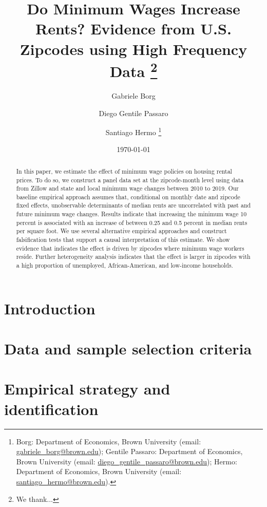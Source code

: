 \documentclass{article}
\title{Do Minimum Wages Increase Rents? 
	   Evidence from U.S. Zipcodes using High Frequency Data 
	   \thanks{We thank...}} %
\author{Gabriele Borg \and Diego Gentile Passaro \and Santiago Hermo
		\footnote{Borg: Department of Economics, Brown University (email: 
		\url{gabriele_borg@brown.edu}); 
		Gentile Passaro: Department of Economics, Brown University (email: 
		\url{diego_gentile_passaro@brown.edu}); 
		Hermo: Department of Economics, Brown University (email: 
		\url{santiago_hermo@brown.edu}).}
		}
\date{\today}
\begin{document}
\maketitle

\begin{abstract}
    \noindent
    In this paper, we estimate the effect of minimum wage policies on housing rental 
    prices. To do so, we construct a panel data set at the zipcode-month level using 
    data from Zillow and state and local minimum wage changes between 2010 to 2019. 
    Our baseline empirical approach assumes that, conditional on monthly date and zipcode 
    fixed effects, unobservable determinants of median rents are uncorrelated with past 
    and future minimum wage changes. Results indicate that increasing the minimum wage 10 
    percent is associated with an increase of between 0.25 and 0.5 percent in median rents 
    per square foot. We use several alternative empirical approaches and construct 
    falsification tests that support a causal interpretation of this estimate. We show 
    evidence that indicates the effect is driven by zipcodes where minimum wage workers 
    reside. Further heterogeneity analysis indicates that the effect is larger in zipcodes 
    with a high proportion of unemployed, African-American, and low-income households.
\end{abstract}

\vspace{5mm}

\maketitle
\onehalfspacing

\clearpage

\section{Introduction}\label{sec:intro}
    

\section{Data and sample selection criteria}\label{sec:data}
	

\section{Empirical strategy and identification}\label{sec:empirical_strategy}
    
\end{document}
